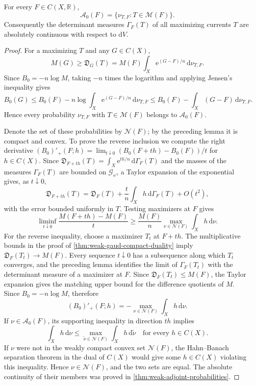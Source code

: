 \begin{theorem}\label{thm:gaud-current-all-adjoints}
For every $F\in C(X,\mathbb R)$,
\[
 \mathcal A_0(F)=\{\nu_{T,F}:T\in\mathscr M(F)\}.
\]
Consequently the determinant measures $\Gamma_F(T)$ of all maximizing currents $T$ are absolutely continuous with respect to $\mathrm{d}V$.
\end{theorem}
\begin{proof}
For a maximizing $T$ and any $G\in C(X)$,
\[
 M(G)\geq\mathfrak D_G(T)
       =M(F)\int_X\mathrm{e}^{(G-F)/n}\,\mathrm{d}\nu_{T,F}.
\]
Since $B_0=-n\log M$, taking $-n$ times the logarithm and applying Jensen's inequality gives
\[
 B_0(G)\leq B_0(F)-n\log\int_X\mathrm{e}^{(G-F)/n}\,\mathrm{d}\nu_{T,F}
          \leq B_0(F)-\int_X(G-F)\,\mathrm{d}\nu_{T,F}.
\]
Hence every probability $\nu_{T,F}$ with $T\in\mathscr M(F)$ belongs to $\mathcal A_0(F)$.

Denote the set of these probabilities by $\mathscr N(F)$; by the preceding lemma it is compact and convex. To prove the reverse inclusion we compute the right derivative $(B_0)'_+(F;h)=\lim_{t\downarrow0}(B_0(F+th)-B_0(F))/t$ for $h\in C(X)$. Since $\mathfrak D_{F+th}(T)=\int_X\mathrm{e}^{th/n}\,\mathrm{d}\Gamma_F(T)$ and the masses of the measures $\Gamma_F(T)$ are bounded on $\mathscr G_\omega$, a Taylor expansion of the exponential gives, as $t\downarrow0$,
\[
 \mathfrak D_{F+th}(T)
 =\mathfrak D_F(T)+\frac tn\int_Xh\,\mathrm{d}\Gamma_F(T)+O(t^2),
\]
with the error bounded uniformly in $T$. Testing maximizers at $F$ gives
\[
 \liminf_{t\downarrow0}\frac{M(F+th)-M(F)}t
    \geq\frac{M(F)}n\max_{\nu\in\mathscr N(F)}\int_Xh\,\mathrm{d}\nu.
\]
For the reverse inequality, choose a maximizer $T_t$ at $F+th$. The multiplicative bounds in the proof of \cref{thm:weak-gaud-compact-duality} imply $\mathfrak D_F(T_t)\to M(F)$. Every sequence $t\downarrow0$ has a subsequence along which $T_t$ converges, and the preceding lemma identifies the limit of $\Gamma_F(T_t)$ with the determinant measure of a maximizer at $F$. Since $\mathfrak D_F(T_t)\leq M(F)$, the Taylor expansion gives the matching upper bound for the difference quotients of $M$. Since $B_0=-n\log M$, therefore
\[
 (B_0)'_+(F;h)
       =-\max_{\nu\in\mathscr N(F)}\int_Xh\,\mathrm{d}\nu.
\]
If $\nu\in\mathcal A_0(F)$, its supporting inequality in direction $th$ implies
\[
 \int_Xh\,\mathrm{d}\nu\leq\max_{\widetilde\nu\in\mathscr N(F)}
                                    \int_Xh\,\mathrm{d}\widetilde\nu
 \quad\text{for every }h\in C(X).
\]
If $\nu$ were not in the weakly compact convex set $\mathscr N(F)$, the Hahn--Banach separation theorem in the dual of $C(X)$ would give some $h\in C(X)$ violating this inequality. Hence $\nu\in\mathscr N(F)$, and the two sets are equal. The absolute continuity of their members was proved in \cref{thm:weak-adjoint-probabilities}.
\end{proof}

